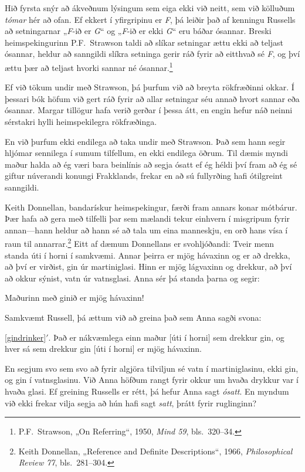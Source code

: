 Hið fyrsta snýr að ákveðnum lýsingum sem eiga ekki við neitt, sem við kölluðum \emph{tómar} hér að ofan. Ef ekkert í yfirgripinu er \emph{F}, þá leiðir það af kenningu Russells að setningarnar „\emph{F}-ið er \emph{G}“ og „\emph{F}-ið er ekki \emph{G}“ eru báðar ósannar. Breski heimspekingurinn P.F.\ Strawson taldi að slíkar setningar ættu ekki að teljast ósannar, heldur að sanngildi slíkra setninga gerir ráð fyrir að eitthvað sé \emph{F}, og því ættu þær að teljast hvorki sannar né ósannar.\footnote{P.F.\ Strawson, „On Referring“, 1950, \emph{Mind 59}, bls.\ 320--34.} 

Ef við tökum undir með Strawson, þá þurfum við að breyta rökfræðinni okkar. Í þessari bók höfum við gert ráð fyrir að allar setningar séu annað hvort sannar eða ósannar. Margar tillögur hafa verið gerðar í þessa átt, en engin hefur náð neinni sérstakri hylli heimspekilegra rökfræðinga.

En við þurfum ekki endilega að taka undir með Strawson. Það sem hann segir hljómar sennilega í sumum tilfellum, en ekki endilega öðrum. Til dæmis myndi maður halda að ég væri bara beinlínis að segja ósatt ef ég héldi því fram að ég sé giftur núverandi konungi Frakklands, frekar en að sú fullyrðing hafi ótilgreint sanngildi.

Keith Donnellan, bandarískur heimspekingur, færði fram annars konar mótbárur. Þær hafa að gera með tilfelli þar sem mælandi tekur einhvern í misgripum fyrir annan---hann heldur að hann sé að tala um eina manneskju, en orð hans vísa í raun til annarrar.\footnote{Keith Donnellan,  „Reference and Definite Descriptions“, 1966, \emph{Philosophical Review 77}, bls.\ 281--304.} Eitt af dæmum Donnellans er svohljóðandi: Tveir menn standa úti í horni í samkvæmi. Annar þeirra er mjög hávaxinn og er að drekka, að því er virðist, gin úr martiniglasi. Hinn er mjög lágvaxinn og drekkur, að því að okkur sýnist, vatn úr vatnsglasi. Anna sér þá standa þarna og segir: 
	\begin{earg}
		\item[\ex{gindrinker}] Maðurinn með ginið er mjög hávaxinn!
	\end{earg}
Samkvæmt Russell, þá ættum við að greina það sem Anna sagði svona: 
	\begin{earg}
		\item[\ref{gindrinker}$'$.] Það er nákvæmlega einn maður [úti í horni] sem drekkur gin, og hver sá sem drekkur gin [úti í horni] er mjög hávaxinn.
	\end{earg}
En segjum svo sem svo að fyrir algjöra tilviljun sé vatn í martiniglasinu, ekki gin, og gin í vatnsglasinu. Við Anna höfðum rangt fyrir okkur um hvaða drykkur var í hvaða glasi. Ef greining Russells er rétt, þá hefur Anna sagt \emph{ósatt}. En myndum við ekki frekar vilja segja að hún hafi sagt \emph{satt}, þrátt fyrir ruglinginn?

